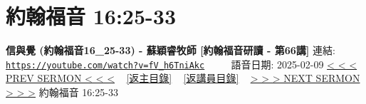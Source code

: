 \documentclass{book}
\begin{document}
\section{約翰福音 16:25-33}
\label{sec:fV_h6TniAkc}
\textbf{信與覺 (約翰福音16\_25-33) - 蘇穎睿牧師 [約翰福音研讀 - 第66講]}
\newline
\newline
連結: \href{https://youtube.com/watch?v=fV_h6TniAkc}{\texttt{https://youtube.com/watch?v=fV\_h6TniAkc}} ~~~~ 語音日期: 2025-02-09
\newline
\newline
\hyperref[sec:HaGDtN4u47U]{< < < PREV SERMON < < <}
~
\hyperlink{toc}{[返主目錄]}
~
\hyperref[ch:preacher10]{[返講員目錄]}
~
\hyperref[sec:wiDRWRXrtjM]{> > > NEXT SERMON > > >}
\newline
\newline
約翰福音 16:25-33
\newline
\end{document}
